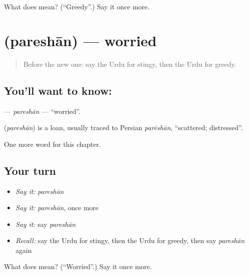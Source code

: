 \begin{tcolorbox}[breakable,colback=teal!4,colframe=teal!35!black,title={Before you move on}]
What does  mean? (\textquotedblleft{}Greedy\textquotedblright{}.) Say it once more.
\end{tcolorbox}
\section[\texorpdfstring{\ur{پریشان} (pareshān)}{پریشان (pareshān)}]{ (pareshān) — worried}

\label{lesson:UR-C193-pareshan}



\begin{quote}
Before the new one: say the Urdu for stingy, then the Urdu for greedy.
\end{quote}

\subsection*{You'll want to know: }
\textbf{} — \emph{pareshān} — \textquotedblleft{}worried\textquotedblright{}.

\begin{cousinweb}
\textbf{} (\emph{pareshān}) is a loan, usually traced to Persian \emph{parēshān}, \textquotedblleft{}scattered; distressed\textquotedblright{}.
\end{cousinweb}

\begin{grammarlens}[title={What you've built}]
One more word for this chapter.
\end{grammarlens}

\subsection*{Your turn}
\begin{itemize}
\raggedright
  \item \emph{Say it:} \emph{pareshān}
  \item \emph{Say it:} \emph{pareshān}, once more
  \item \emph{Say it:} say \emph{pareshān}
  \item \emph{Recall:} say the Urdu for stingy, then the Urdu for greedy, then say \emph{pareshān} again
\end{itemize}

\begin{tcolorbox}[breakable,colback=teal!4,colframe=teal!35!black,title={Before you move on}]
What does  mean? (\textquotedblleft{}Worried\textquotedblright{}.) Say it once more.
\end{tcolorbox}
